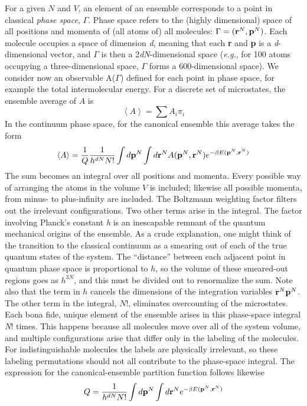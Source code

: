 \documentclass[9pt,bestpractices]{molsim}
\begin{document}
For a given $N$ and $V$, an element of an ensemble corresponds to a point in
classical \emph{phase space}, $\Gamma$. Phase space refers to the (highly
dimensional) space of all positions and momenta of (all atoms of) all
molecules: $\Gamma  = ({{\bf{r}}^N},{{\bf{p}}^N})$. Each molecule occupies a space of dimension \emph{d},
meaning that each \textbf{r} and \textbf{p} is a \emph{d}-dimensional
vector, and $\Gamma$ is then a 2\emph{dN}-dimensional space (\emph{e.g.}, for
100 atoms occupying a three-dimensional space, $\Gamma$ forms a 600-dimensional
space). We consider now an observable A($\Gamma$) defined for each point in
phase space, for example the total intermolecular energy. For a discrete
set of microstates, the ensemble average of $A$ is
\[\left\langle A \right\rangle  = \sum {{A_i}{\pi _i}} \]
In the continuum phase space, for the canonical ensemble this average
takes the form
\[\left\langle A \right\rangle  = \frac{1}{Q} \frac{1}{h^{dN}N!}\int {d{{\bf p}^N}\int {d{{\bf r}^N}A({{\bf p}^N},{{\bf r}^N})} {e^{ - \beta E({{\bf p}^N},{{\bf r}^N})}}} \]
The sum becomes an integral over all positions and momenta. Every
possible way of arranging the atoms in the volume $V$ is included;
likewise all possible momenta, from minus- to plus-infinity are
included. The Boltzmann weighting factor filters out the irrelevant
configurations. Two other terms arise in the integral. The factor
involving Planck's constant \emph{h} is an inescapable remnant of the
quantum mechanical origins of the ensemble. As a crude explanation, one
might think of the transition to the classical continuum as a smearing
out of each of the true quantum states of the system. The ``distance''
between each adjacent point in quantum phase space is proportional to
$h$, so the volume of these smeared-out regions goes as
$h^{3N}$, and this must be divided out to
renormalize the sum. Note also that the term in $h$ cancels the
dimensions of the integration variables
${\bf r}^N{\bf p}^N$. The other term in the
integral, $N!$, eliminates overcounting of the microstates. Each
bona fide, unique element of the ensemble arises in this phase-space
integral \emph{N}! times. This happens because all molecules move over
all of the system volume, and multiple configurations arise that differ
only in the labeling of the molecules. For indistinguishable molecules
the labels are physically irrelevant, so these labeling permutations
should not all contribute to the phase-space integral. The expression
for the canonical-ensemble partition function follows likewise
\[Q = \frac{1}{h^{dN}N!}\int {d{{\bf p}^N}\int {d{{\bf r}^N}} {e^{ - \beta E({{\bf p}^N},{{\bf r}^N})}}} \]
\end{document}
